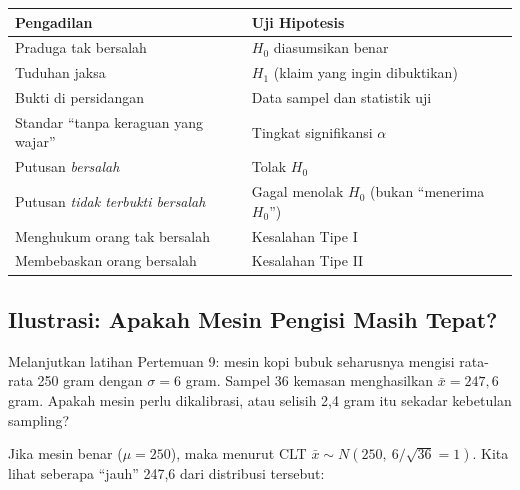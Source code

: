 \documentclass[
  indonesian,
  letterpaper,
]{book}
\newcounter{none} %
\begin{document}
{\def\LTcaptype{none} %
\begin{longtable}[]{@{}
  >{\raggedright\arraybackslash}p{}
  >{\raggedright\arraybackslash}p{}@{}}
\toprule\noalign{}
\begin{minipage}[b]{\linewidth}\raggedright
Pengadilan
\end{minipage} & \begin{minipage}[b]{\linewidth}\raggedright
Uji Hipotesis
\end{minipage} \\
\midrule\noalign{}
\endhead
\bottomrule\noalign{}
\endlastfoot
Praduga tak bersalah & \(H_0\) diasumsikan benar \\
Tuduhan jaksa & \(H_1\) (klaim yang ingin dibuktikan) \\
Bukti di persidangan & Data sampel dan statistik uji \\
Standar ``tanpa keraguan yang wajar'' & Tingkat signifikansi
\(\alpha\) \\
Putusan \emph{bersalah} & Tolak \(H_0\) \\
Putusan \emph{tidak terbukti bersalah} & Gagal menolak \(H_0\) (bukan
``menerima \(H_0\)'') \\
Menghukum orang tak bersalah & Kesalahan Tipe I \\
Membebaskan orang bersalah & Kesalahan Tipe II \\
\end{longtable}
}

\subsection{Ilustrasi: Apakah Mesin Pengisi Masih
Tepat?}\label{ilustrasi-apakah-mesin-pengisi-masih-tepat}

Melanjutkan latihan Pertemuan 9: mesin kopi bubuk seharusnya mengisi
rata-rata 250 gram dengan \(\sigma = 6\) gram. Sampel 36 kemasan
menghasilkan \(\bar{x} = 247{,}6\) gram. Apakah mesin perlu dikalibrasi,
atau selisih 2,4 gram itu sekadar kebetulan sampling?

Jika mesin benar (\(\mu = 250\)), maka menurut CLT
\(\bar{x} \sim N(250,\ 6/\sqrt{36} = 1)\). Kita lihat seberapa ``jauh''
247,6 dari distribusi tersebut:
\end{document}
